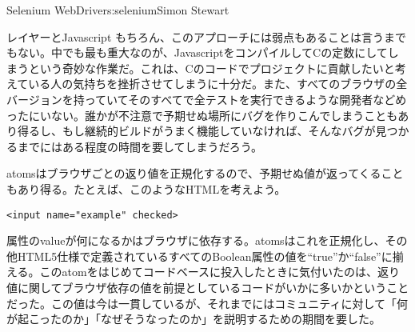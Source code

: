 \begin{aosachapter}{Selenium WebDriver}{s:selenium}{Simon Stewart}
\begin{aosasect1}{レイヤーとJavascript}
もちろん、このアプローチには弱点もあることは言うまでもない。中でも最も重大なのが、JavascriptをコンパイルしてCの定数にしてしまうという奇妙な作業だ。これは、Cのコードでプロジェクトに貢献したいと考えている人の気持ちを挫折させてしまうに十分だ。また、すべてのブラウザの全バージョンを持っていてそのすべてで全テストを実行できるような開発者などめったにいない。誰かが不注意で予期せぬ場所にバグを作りこんでしまうこともあり得るし、もし継続的ビルドがうまく機能していなければ、そんなバグが見つかるまでにはある程度の時間を要してしまうだろう。

atomsはブラウザごとの返り値を正規化するので、予期せぬ値が返ってくることもあり得る。たとえば、このようなHTMLを考えよう。

\begin{verbatim}
<input name="example" checked>
\end{verbatim}

\noindent {}属性のvalueが何になるかはブラウザに依存する。atomsはこれを正規化し、その他HTML5仕様で定義されているすべてのBoolean属性の値を``true''か``false''に揃える。このatomをはじめてコードベースに投入したときに気付いたのは、返り値に関してブラウザ依存の値を前提としているコードがいかに多いかということだった。この値は今は一貫しているが、それまでにはコミュニティに対して「何が起こったのか」「なぜそうなったのか」を説明するための期間を要した。


\end{aosasect1}
\end{aosachapter}
